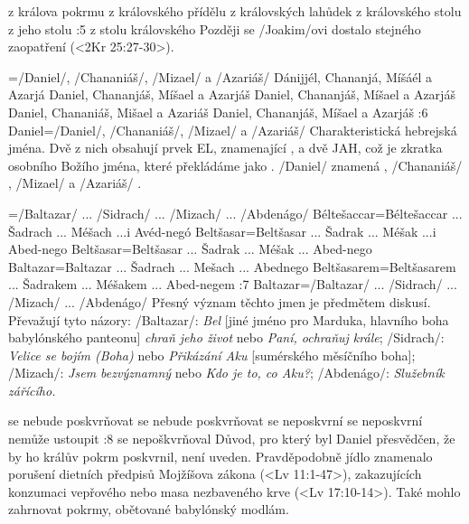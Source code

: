     {z králova pokrmu} %
    {z královského přídělu}  %
    {z královských lahůdek} %
    {z královského stolu}  %
    {z jeho stolu} %
:5 {z stolu královského} Později se \x/Joakim/ovi dostalo stejného zaopatření (<2Kr 25:27-30>).

={\x/Daniel/, \x/Chananiáš/, \x/Mizael/ a \x/Azariáš/}  %
    {Dánijjél, Chananjá, Míšáél a Azarjá} %
    {Daniel, Chananjáš, Míšael a Azarjáš}  %
    {Daniel, Chananjáš, Míšael a Azarjáš} %
    {Daniel, Chananiáš, Mišael a Azariáš}  %
    {Daniel, Chananjáš, Míšael a Azarjáš}  %
:6 {Daniel}={\x/Daniel/, \x/Chananiáš/, \x/Mizael/ a \x/Azariáš/} Charakteristická  hebrejská jména. Dvě z nich obsahují prvek EL, znamenající , a dvě JAH, což je zkratka osobního Božího jména, které překládáme jako .  \x/Daniel/ znamená , \x/Chananiáš/ , \x/Mizael/  a \x/Azariáš/ .

={\x/Baltazar/ ... \x/Sidrach/ ... \x/Mizach/ ... \x/Abdenágo/}  %
    {Béltešaccar}={Béltešaccar ... Šadrach ... Méšach ...i Avéd-negó} %
    {Beltšasar}={Beltšasar ... Šadrak ... Méšak ...i Abed-nego}  %
    {Beltšasar}={Beltšasar ... Šadrak ... Méšak ... Abed-nego} %
    {Baltazar}={Baltazar ... Šadrach ... Mešach ... Abednego}  %
    {Beltšasarem}={Beltšasarem ... Šadrakem ... Méšakem ... Abed-negem}  %
:7  {Baltazar}={\x/Baltazar/ ... \x/Sidrach/ ... \x/Mizach/ ... \x/Abdenágo/}
     Přesný význam těchto jmen je předmětem diskusí. Převažují tyto názory: 
     \x/Baltazar/: {\em Bel} [jiné jméno pro Marduka, hlavního boha babylónského panteonu]
     {\em chraň jeho život} nebo {\em Paní, ochraňuj krále}; 
     \x/Sidrach/: {\em Velice se bojím (Boha)} nebo {\em Přikázání Aku} [sumérského měsíčního boha];
     \x/Mizach/:   {\em Jsem bezvýznamný} nebo {\em Kdo je to, co Aku?};
     \x/Abdenágo/: {\em Služebník zářícího.}
     
    {se nebude poskvrňovat} %
    {se nebude poskvrňovat}  %
    {se neposkvrní} %
    {se neposkvrní}  %
    {nemůže ustoupit}  %
:8 {se nepoškvrňoval} Důvod, pro který byl Daniel přesvědčen, že by ho králův pokrm poskvrnil, není uveden. Pravděpodobně jídlo znamenalo porušení dietních předpisů Mojžíšova zákona  (<Lv 11:1-47>), zakazujících konzumaci vepřového nebo masa nezbaveného krve (<Lv 17:10-14>). Také mohlo zahrnovat pokrmy, obětované babylónský modlám. 

